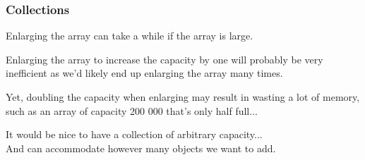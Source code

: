 \begin{frame}
\frametitle{Collections}

Enlarging the array can take a while if the array is large.

Enlarging the array to increase the capacity by one will probably be very inefficient as we'd likely end up enlarging the array many times.

Yet, doubling the capacity when enlarging may result in wasting a lot of memory, such as an array of capacity 200 000 that's only half full...

It would be nice to have a \alert{collection} of arbitrary capacity...\\
\quad And can accommodate however many objects we want to add.



\end{frame}



